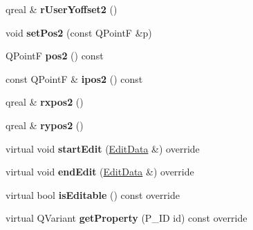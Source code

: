\begin{DoxyCompactItemize}
\mbox{\label{class_ms_1_1_spanner_segment_a5ad8950a74f1c298392cf020cf4df140}} 
qreal \& {\bfseries r\+User\+Yoffset2} ()
\item 
\mbox{\label{class_ms_1_1_spanner_segment_a5ea028ea87718a7570b5aa04491814e8}} 
void {\bfseries set\+Pos2} (const Q\+PointF \&p)
\item 
\mbox{\label{class_ms_1_1_spanner_segment_a425170b3f0dc5fdd16805dfeaed36e32}} 
Q\+PointF {\bfseries pos2} () const
\item 
\mbox{\label{class_ms_1_1_spanner_segment_a393093bf153be4b17e13e78995997235}} 
const Q\+PointF \& {\bfseries ipos2} () const
\item 
\mbox{\label{class_ms_1_1_spanner_segment_ab7d296c03fa94069b1ef3e952046cd6b}} 
qreal \& {\bfseries rxpos2} ()
\item 
\mbox{\label{class_ms_1_1_spanner_segment_ae6f1c772868e36243b145e775cac3a97}} 
qreal \& {\bfseries rypos2} ()
\item 
\mbox{\label{class_ms_1_1_spanner_segment_a408bcbf4c6b6a4f24976ecd0ce553d4d}} 
virtual void {\bfseries start\+Edit} (\hyperlink{class_ms_1_1_edit_data}{Edit\+Data} \&) override
\item 
\mbox{\label{class_ms_1_1_spanner_segment_a458db9a1db3148bd7e93305e618992f9}} 
virtual void {\bfseries end\+Edit} (\hyperlink{class_ms_1_1_edit_data}{Edit\+Data} \&) override
\item 
\mbox{\label{class_ms_1_1_spanner_segment_a9adb442fcfa91bf1b1f3c30e022f1da9}} 
virtual bool {\bfseries is\+Editable} () const override
\item 
\mbox{\label{class_ms_1_1_spanner_segment_adb42c1082ef4841c847f6984e1b1459a}} 
virtual Q\+Variant {\bfseries get\+Property} (P\+\_\+\+ID id) const override
\item 
\mbox{\label{class_ms_1_1_spanner_segment_af49996d116685a645f0d4eb89ea374ca}} 

\end{DoxyCompactItemize}
